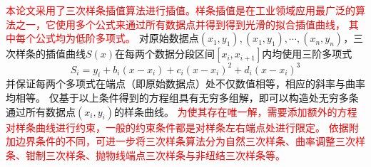 \textcolor{red}{
本论文采用了三次样条插值算法进行插值\cite{Timothy2018,Carl2008}。样条插值是在工业领域应用最广泛的算法之一，它使用多个公式来通过所有数据点并得到得到光滑的拟合插值曲线，
其中每个公式均为低阶多项式。
}
对原始数据点$(x_1,y_1),(x_1,y_1),\cdots,(x_n,y_n)$，三次样条的插值曲线$S(x)$在每两个数据分段区间$[x_i,x_{i+1}]$内均使用三阶多项式
\begin{equation}
    \label{equ:spline}
    S_{i}=y_{i}+b_{i}(x-x_{i})+c_{i}{(x-x_{i})}^2+d_{i}{(x-x_{i})}^3
\end{equation}
并保证每两个多项式在端点（即原始数据点）处不仅数值相等，相应的斜率与曲率均相等。
仅基于以上条件得到的方程组具有无穷多组解，即可以构造处无穷多条通过所有数据点$(x_i,y_i)$的样条曲线。
\textcolor{red}{
为使其存在唯一解，需要添加额外的方程对样条曲线进行约束，一般的约束条件都是对样条左右端点处进行限定。
依据附加边界条件的不同，可进一步将三次样条算法分为自然三次样条、曲率调整三次样条、钳制三次样条、抛物线端点三次样条与非纽结三次样条等\cite{Timothy2018}。
}
% 
